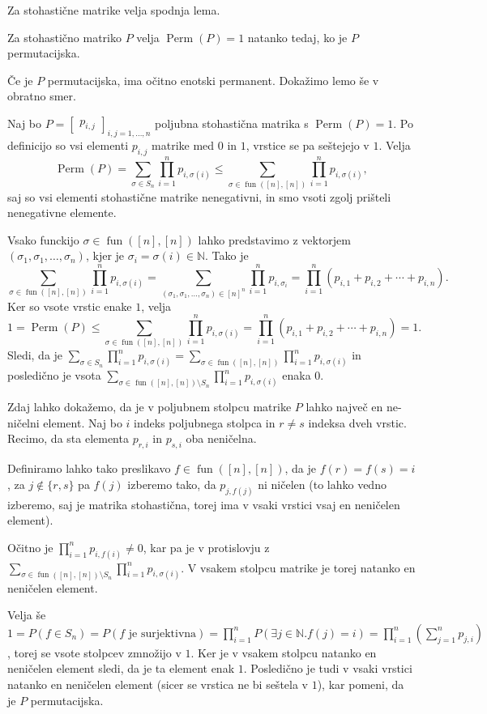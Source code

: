 \documentclass[mat2, tisk]{fmfdelo}
\newcommand{\N}{\mathbb N}
\newcommand{\fun}{\operatorname{fun}}
\newcommand{\funnn}[1]{\fun([#1], [#1])}
\begin{document}
Za stohastične matrike velja spodnja lema.
\begin{lema}
    Za stohastično matriko $P$ velja $\operatorname{Perm}(P)=1$ natanko tedaj, ko je $P$ permutacijska.
\end{lema}
\begin{dokaz}
    Če je $P$ permutacijska, ima očitno enotski permanent. Dokažimo lemo še v obratno smer.
    
    Naj bo $P = \begin{bmatrix}
        p_{i,j}
    \end{bmatrix}_{i,j=1,\dotsc, n}$ poljubna stohastična matrika s $\operatorname{Perm}(P) = 1$. Po definicijo so vsi elementi  $p_{i,j}$ matrike med $0$ in $1$, vrstice se pa seštejejo v $1$.
    Velja
    $$
    \operatorname{Perm}(P) = \sum_{\sigma  \in S_n} \prod_{i=1}^n p_{i, \sigma(i)} \leq \sum_{\sigma  \in \funnn{n}} \prod_{i=1}^n p_{i, \sigma(i)},
    $$
    saj so vsi elementi stohastične matrike nenegativni, in smo vsoti zgolj prišteli nenegativne elemente.

    Vsako funckijo $\sigma \in \funnn{n}$ lahko predstavimo z vektorjem $(\sigma_1, \sigma_1, \dotsc, \sigma_n)$, kjer je $\sigma_i = \sigma(i) \in \N$. Tako je 
    $$
    \sum_{\sigma  \in \funnn{n}} \prod_{i=1}^n p_{i, \sigma(i)} =
    \sum_{(\sigma_1, \sigma_1, \dotsc, \sigma_n) \in [n]^n} \prod_{i=1}^n p_{i, \sigma_i} = 
    \prod_{i=1}^n (p_{i, 1} + p_{i, 2} + \dotsm + p_{i, n}).
    $$
    Ker so vsote vrstic enake $1$, velja 
    $$
    1 = \operatorname{Perm}(P) \leq  \sum_{\sigma  \in \funnn{n}} \prod_{i=1}^n p_{i, \sigma(i)} = \prod_{i=1}^n (p_{i, 1} + p_{i, 2} + \dotsm + p_{i, n}) = 1.
    $$
    Sledi, da je  $\sum_{\sigma  \in S_n}  \prod_{i=1}^n p_{i, \sigma(i)} =  \sum_{\sigma  \in \funnn{n}} \prod_{i=1}^n p_{i, \sigma(i)} $ in posledično je vsota 
    $ 
    \sum_{\sigma  \in \funnn{n} \setminus S_n} \prod_{i=1}^n p_{i, \sigma(i)}
    $ enaka $0$.

    Zdaj lahko dokažemo, da je  v poljubnem stolpcu matrike $P$ lahko največ en ne-ničelni element. Naj bo $i$ indeks poljubnega stolpca in $r \neq s$ indeksa dveh vrstic. Recimo, da sta elementa $p_{r, i}$ in $p_{s,i}$ oba neničelna. 

    Definiramo lahko tako preslikavo $f \in \funnn{n}$, da je $f(r) = f(s) = i$, za $j \notin \{r, s\}$ pa $f(j)$ izberemo tako, da $p_{j, f(j)}$ ni ničelen (to lahko vedno izberemo, saj je matrika stohastična, torej ima v vsaki vrstici vsaj en neničelen element). 

    Očitno je $\prod_{i=1}^n p_{i, f(i)} \neq 0$, kar pa je v protislovju z $ \displaystyle \sum_{\sigma  \in \funnn{n} \setminus S_n} \prod_{i=1}^n p_{i, \sigma(i)}$.   V vsakem stolpcu matrike je torej natanko en neničelen element. 

    Velja še $1 = P(f \in S_n) = P(f \text{ je surjektivna}) = \prod_{i=1}^n P(\exists j \in \N. f(j)= i) = 
     \prod_{i=1}^n (\sum_{j=1}^n p_{j, i})$, torej se vsote stolpcev zmnožijo v $1$. Ker je v vsakem stolpcu natanko en neničelen element sledi, da je ta element enak $1$.  Posledično je tudi v vsaki vrstici natanko en neničelen element (sicer se vrstica ne bi seštela v $1$), kar pomeni, da je $P$ permutacijska. 
\end{dokaz}
\end{document}
